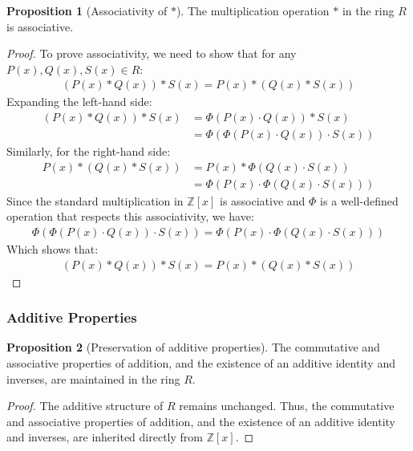 \documentclass{article}
\theoremstyle{plain}
\theoremstyle{definition}
\newtheorem{proposition}{Proposition}
\begin{document}
\begin{proposition}[Associativity of \(\ast\)] \label{proposition:ring:2}
The multiplication operation \(\ast\) in the ring \(R\) is associative.
\end{proposition}
\begin{proof}
To prove associativity, we need to show that for any \( P(x), Q(x), S(x) \in R \):
\begin{align}
    (P(x) \ast Q(x)) \ast S(x) = P(x) \ast (Q(x) \ast S(x))
\end{align}
Expanding the left-hand side:
\begin{align}
    (P(x) \ast Q(x)) \ast S(x) &= \Phi(P(x) \cdot Q(x)) \ast S(x) \\
    &= \Phi(\Phi(P(x) \cdot Q(x)) \cdot S(x))
\end{align}
Similarly, for the right-hand side:
\begin{align}
    P(x) \ast (Q(x) \ast S(x)) &= P(x) \ast \Phi(Q(x) \cdot S(x)) \\
    &= \Phi(P(x) \cdot \Phi(Q(x) \cdot S(x)))
\end{align}
Since the standard multiplication in \(\mathbb{Z}[x]\) is associative and \(\Phi\) is a well-defined operation that respects this associativity, we have:
\begin{align}
    \Phi(\Phi(P(x) \cdot Q(x)) \cdot S(x)) = \Phi(P(x) \cdot \Phi(Q(x) \cdot S(x)))
\end{align}
Which shows that:
\begin{align}
    (P(x) \ast Q(x)) \ast S(x) = P(x) \ast (Q(x) \ast S(x))
\end{align}
\end{proof}

\subsubsection{Additive Properties}
\begin{proposition}[Preservation of additive properties] \label{proposition:ring:3}
The commutative and associative properties of addition, and the existence of an additive identity and inverses, are maintained in the ring \(R\). 
\end{proposition}
\begin{proof}
The additive structure of \(R\) remains unchanged. Thus, the commutative and associative properties of addition, and the existence of an additive identity and inverses, are inherited directly from \( \mathbb{Z}[x] \).
\end{proof}
\end{document}
